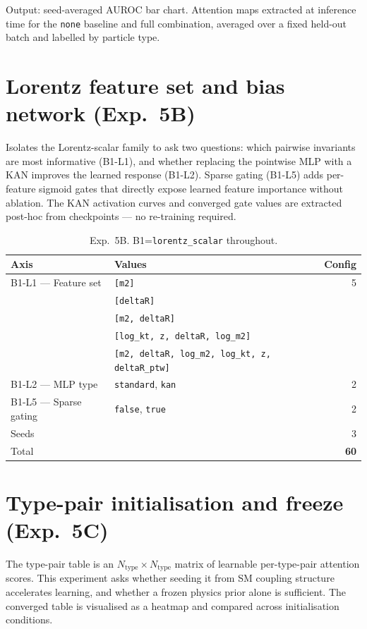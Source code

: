 Output: seed-averaged AUROC bar chart. Attention maps extracted at
inference time for the \texttt{none} baseline and full combination,
averaged over a fixed held-out batch and labelled by particle type.

\section{Lorentz feature set and bias network (Exp.\ 5B)}

Isolates the Lorentz-scalar family to ask two questions: which pairwise
invariants are most informative (B1-L1), and whether replacing the
pointwise MLP with a KAN improves the learned response (B1-L2). Sparse
gating (B1-L5) adds per-feature sigmoid gates that directly expose
learned feature importance without ablation. The KAN activation curves
and converged gate values are extracted post-hoc from checkpoints ---
no re-training required.

\begin{table}[h]
\centering\small
\begin{tabular}{llr}
\toprule
Axis & Values & Config \\
\midrule
B1-L1 — Feature set & \texttt{[m2]} & 5 \\
 & \texttt{[deltaR]} & \\
 & \texttt{[m2, deltaR]} & \\
 & \texttt{[log\_kt, z, deltaR, log\_m2]} & \\
 & \texttt{[m2, deltaR, log\_m2, log\_kt, z, deltaR\_ptw]} & \\
B1-L2 — MLP type & \texttt{standard}, \texttt{kan} & 2 \\
B1-L5 — Sparse gating & \texttt{false}, \texttt{true} & 2 \\
Seeds & & 3 \\
\midrule
Total & & \textbf{60} \\
\bottomrule
\end{tabular}
\caption{Exp.\ 5B. B1=\texttt{lorentz\_scalar} throughout.}
\end{table}

\section{Type-pair initialisation and freeze (Exp.\ 5C)}

The type-pair table is an $N_\text{type} \times N_\text{type}$ matrix
of learnable per-type-pair attention scores. This experiment asks
whether seeding it from SM coupling structure accelerates learning, and
whether a frozen physics prior alone is sufficient. The converged table
is visualised as a heatmap and compared across initialisation conditions.

